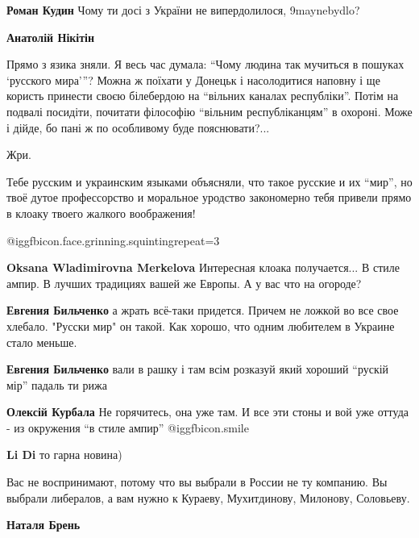 \begin{itemize}
\begin{itemize}
\textbf{Роман Кудин} Чому ти досі з України не випердолилося, 9maynebydlo?

\textbf{Анатолій Нікітін} 

Прямо з язика зняли. Я весь час думала: \enquote{Чому людина так мучиться в пошуках
\enquote{русского мира}}? Можна ж поїхати у Донецьк і насолодитися наповну і ще користь
принести своєю білебердою на \enquote{вільних каналах республіки}. Потім на подвалі
посидіти, почитати філософію \enquote{вільним республіканцям} в охороні. Може і дійде,
бо пані ж по особливому буде пояснювати?...

\end{itemize} %

Жри.

Тебе русским и украинским языками объясняли, что такое русские и их \enquote{мир}, но
твоё дутое профессорство и моральное уродство закономерно тебя привели прямо в
клоаку твоего жалкого воображения!

 @igg{fbicon.face.grinning.squinting}{repeat=3} 

\begin{itemize} %
\textbf{Oksana Wladimirovna Merkelova} Интересная клоака получается... В стиле ампир. В лучших традициях вашей же Европы. А у вас что на огороде?

\textbf{Евгения Бильченко} а жрать всё-таки придется. Причем не ложкой во все свое хлебало. "Русски мир" он такой. Как хорошо, что одним любителем в Украине стало меньше.

\textbf{Евгения Бильченко} вали в рашку і там всім розказуй який хороший \enquote{рускій мір} падаль ти рижа

\textbf{Олексій Курбала} Не горячитесь, она уже там. И все эти стоны и вой уже оттуда - из окружения \enquote{в стиле ампир}  @igg{fbicon.smile} 

\textbf{Li Di} то гарна новина)
\end{itemize} %


Вас не воспринимают, потому что вы выбрали в России не ту компанию. Вы выбрали
либералов, а вам нужно к Кураеву, Мухитдинову, Милонову, Соловьеву.

\begin{itemize} %
\textbf{Наталя Брень} 


\end{itemize}
\end{itemize}
